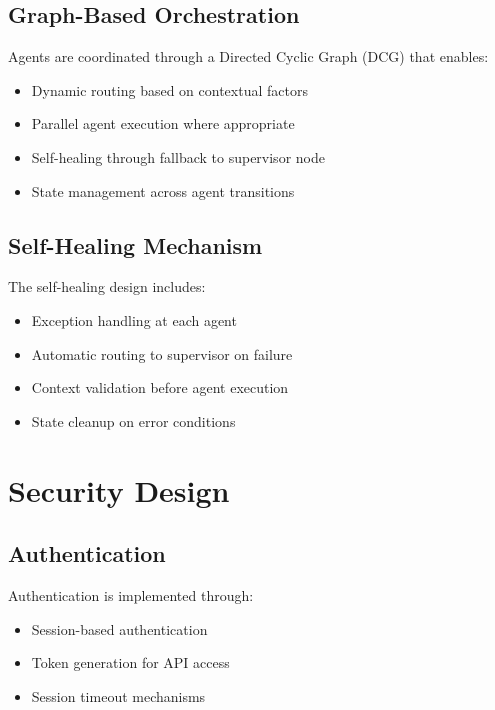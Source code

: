 \subsection{Graph-Based Orchestration}

Agents are coordinated through a Directed Cyclic Graph (DCG) that enables:

\begin{itemize}
    \item Dynamic routing based on contextual factors
    \item Parallel agent execution where appropriate
    \item Self-healing through fallback to supervisor node
    \item State management across agent transitions
\end{itemize}

\subsection{Self-Healing Mechanism}

The self-healing design includes:

\begin{itemize}
    \item Exception handling at each agent
    \item Automatic routing to supervisor on failure
    \item Context validation before agent execution
    \item State cleanup on error conditions
\end{itemize}

\section{Security Design}

\subsection{Authentication}

Authentication is implemented through:

\begin{itemize}
    \item Session-based authentication
    \item Token generation for API access
    \item Session timeout mechanisms
\end{itemize}

